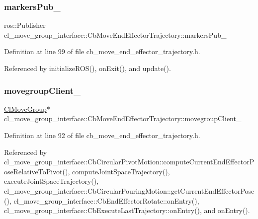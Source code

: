 \subsubsection{\texorpdfstring{markers\+Pub\+\_\+}{markersPub\_}}
{\footnotesize\ttfamily ros\+::\+Publisher cl\+\_\+move\+\_\+group\+\_\+interface\+::\+Cb\+Move\+End\+Effector\+Trajectory\+::markers\+Pub\+\_\+\hspace{0.3cm}{\ttfamily [private]}}



Definition at line 99 of file cb\+\_\+move\+\_\+end\+\_\+effector\+\_\+trajectory.\+h.



Referenced by initialize\+R\+O\+S(), on\+Exit(), and update().

\mbox{\label{classcl__move__group__interface_1_1CbMoveEndEffectorTrajectory_aea650d3e7836125b32be97392b71a7f3}} 
\subsubsection{\texorpdfstring{movegroup\+Client\+\_\+}{movegroupClient\_}}
{\footnotesize\ttfamily \hyperlink{classcl__move__group__interface_1_1ClMoveGroup}{Cl\+Move\+Group}$\ast$ cl\+\_\+move\+\_\+group\+\_\+interface\+::\+Cb\+Move\+End\+Effector\+Trajectory\+::movegroup\+Client\+\_\+\hspace{0.3cm}{\ttfamily [protected]}}



Definition at line 92 of file cb\+\_\+move\+\_\+end\+\_\+effector\+\_\+trajectory.\+h.



Referenced by cl\+\_\+move\+\_\+group\+\_\+interface\+::\+Cb\+Circular\+Pivot\+Motion\+::compute\+Current\+End\+Effector\+Pose\+Relative\+To\+Pivot(), compute\+Joint\+Space\+Trajectory(), execute\+Joint\+Space\+Trajectory(), cl\+\_\+move\+\_\+group\+\_\+interface\+::\+Cb\+Circular\+Pouring\+Motion\+::get\+Current\+End\+Effector\+Pose(), cl\+\_\+move\+\_\+group\+\_\+interface\+::\+Cb\+End\+Effector\+Rotate\+::on\+Entry(), cl\+\_\+move\+\_\+group\+\_\+interface\+::\+Cb\+Execute\+Last\+Trajectory\+::on\+Entry(), and on\+Entry().

